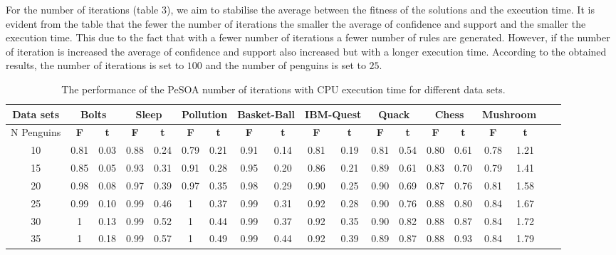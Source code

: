 \documentclass[preprint,12pt]{elsarticle}
\begin{document}
For the number of iterations (table 3), we aim to stabilise the average between the fitness of the solutions and the execution time. It is evident from the table that the fewer the number of iterations the smaller the average of confidence and support and the smaller the execution time. This due to the fact that with a fewer number of iterations a fewer number of rules are generated. However, if the number of iteration is increased the average of confidence and support also increased but with a longer execution time. According to the obtained results, 
the number of iterations is set to $100$ and the number of penguins is set to $25$.
\begin{landscape}
\begin{table}[b]
\renewcommand{\arraystretch}{1.3}
\caption{The performance of the PeSOA number of iterations with CPU execution time for different data sets.}
\label{sample-table}
\begin{tabular}{c c c c c c c c c c c c c c c c c c c}
\toprule
\textbf{Data sets} &  \multicolumn{2}{c}{Bolts} & \multicolumn{2}{c}{Sleep} & \multicolumn{2}{c}{Pollution}& \multicolumn{2}{c}{Basket-Ball}& \multicolumn{2}{c}{IBM-Quest}& \multicolumn{2}{c}{Quack}& \multicolumn{2}{c}{Chess}& \multicolumn{2}{c}{Mushroom}\\\midrule
{N Penguins}   & \textbf{F}  & \textbf{t}  & \textbf{F}  & \textbf{t} & \textbf{F}  & \textbf{t} & \textbf{F}  & \textbf{t} & \textbf{F}  & \textbf{t} & \textbf{F}  & \textbf{t} & \textbf{F}  & \textbf{t} & \textbf{F}  & \textbf{t} \\\hline                      
10		&		0.81 & 	0.03		& 		0.88 & 	0.24	&		0.79 & 0.21	&		0.91 & 	0.14		&	 0.81 &	0.19	& 0.81 &  0.54 &	0.80 &	0.61  &	0.78 & 	1.21 \\\hline
15		&		0.85 & 	0.05		& 		0.93 & 	0.31	&		0.91 & 0.28	&		0.95 & 	0.20		&	 0.86 & 0.21	& 0.89 &  0.61 &	0.83 &	0.70  &	0.79 &	1.41 \\\hline
20    &		0.98 & 	0.08		& 		0.97 & 	0.39	&		0.97 & 0.35	&		0.98 & 	0.29		&	 0.90 &	0.25	& 0.90 &  0.69 &	0.87 &	0.76  &	0.81 &  1.58	 \\\hline
25		&		0.99 & 	0.10		& 		0.99 & 	0.46	&		1    & 0.37	&	  0.99 & 	0.31	  &	 0.92 &	0.28	& 0.90 &  0.76 &	0.88 &  0.80  &	0.84 & 	1.67 \\\hline
30		&	  1    & 	0.13		& 		0.99 & 	0.52  &		1    & 0.44	&		0.99 & 	0.37		&	 0.92 &	0.35	& 0.90 &  0.82 &	0.88 &  0.87  &	0.84 &  1.72 \\\hline
35	  &		1    & 	0.18	  & 		0.99 & 	0.57	&		1    & 0.49	&		0.99 & 	0.44 	  &	 0.92 &	0.39	& 0.89 &  0.87 &	0.88 &  0.93  & 0.84 & 	1.79 \\\hline

\end{tabular}
\end{table}
\end{landscape}
\end{document}
